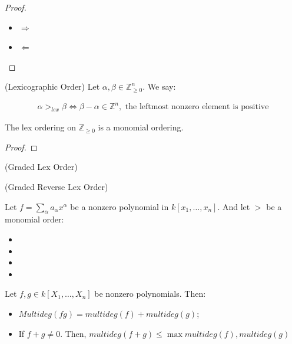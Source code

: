 \documentclass[Total.tex]{subfiles}
\begin{document}
				\begin{proof}
					\begin{itemize}
						\item $\Rightarrow$
						
						\item $\Leftarrow$
					\end{itemize}
				\end{proof}
				
				\begin{Def}
					(Lexicographic Order) Let $\alpha,\beta\in \mathbb{Z}^n_{\geq 0}$. We say:
					
					\begin{gather*}
						\alpha>_{lex}\beta\Leftrightarrow \beta-\alpha\in \mathbb{Z}^n,\mbox{ the leftmost nonzero element is positive}
					\end{gather*}
				\end{Def}
				
				\begin{proposition}
					The lex ordering on $\mathbb{Z}_{\geq 0}$ is a monomial ordering.
				\end{proposition}
				
				\begin{proof}
				\end{proof}
				
				\begin{Def}
					(Graded Lex Order)
				\end{Def}
				
				\begin{Def}
					(Graded Reverse Lex Order)
				\end{Def}
				
				\begin{Def}
					Let $f=\sum_\alpha a_\alpha x^\alpha$ be a nonzero polynomial in $k[x_1,\dots,x_n]$. And let $>$ be a monomial order:
					
					\begin{itemize}
						\item 
						\item 
						\item 
						\item 
					\end{itemize}
				\end{Def}
				
				\begin{lemma}
					Let $f,g\in k[X_1,\dots,X_n]$ be nonzero polynomials. Then:
					
					\begin{itemize}
						\item $Multideg(fg)=multideg(f)+multideg(g)$;
						\item If $f+g\not=0$. Then, $multideg(f+g)\leq \max{multideg(f),multideg(g)}$
					\end{itemize}
				\end{lemma}
				
\end{document}

